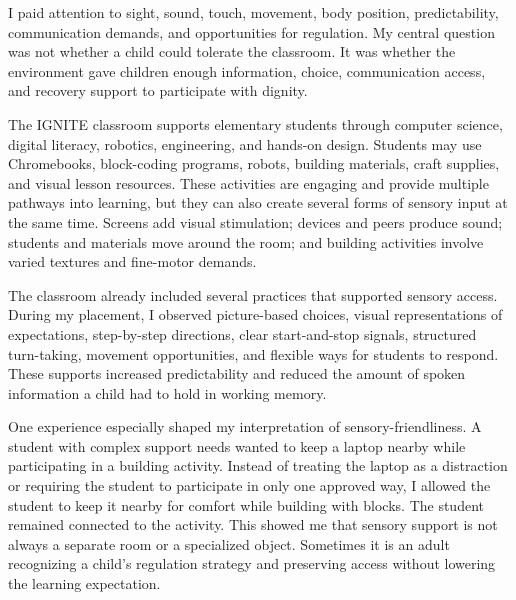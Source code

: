 \documentclass[11pt]{article}
\newcommand{\reviewsection}[1]{\vspace{0.07in}\noindent{\normalsize\bfseries\color{PrimaryRed}#1}\par\vspace{0.02in}}
\begin{document}
I paid attention to sight, sound, touch, movement, body position, predictability, communication demands, and opportunities for regulation. My central question was not whether a child could tolerate the classroom. It was whether the environment gave children enough information, choice, communication access, and recovery support to participate with dignity.

\reviewsection{Summary of the Experience}

The IGNITE classroom supports elementary students through computer science, digital literacy, robotics, engineering, and hands-on design. Students may use Chromebooks, block-coding programs, robots, building materials, craft supplies, and visual lesson resources. These activities are engaging and provide multiple pathways into learning, but they can also create several forms of sensory input at the same time. Screens add visual stimulation; devices and peers produce sound; students and materials move around the room; and building activities involve varied textures and fine-motor demands.

The classroom already included several practices that supported sensory access. During my placement, I observed picture-based choices, visual representations of expectations, step-by-step directions, clear start-and-stop signals, structured turn-taking, movement opportunities, and flexible ways for students to respond. These supports increased predictability and reduced the amount of spoken information a child had to hold in working memory.

One experience especially shaped my interpretation of sensory-friendliness. A student with complex support needs wanted to keep a laptop nearby while participating in a building activity. Instead of treating the laptop as a distraction or requiring the student to participate in only one approved way, I allowed the student to keep it nearby for comfort while building with blocks. The student remained connected to the activity. This showed me that sensory support is not always a separate room or a specialized object. Sometimes it is an adult recognizing a child's regulation strategy and preserving access without lowering the learning expectation.

\reviewsection{Sensory Evidence}
\end{document}
